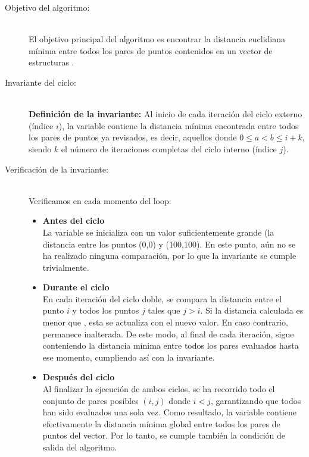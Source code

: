 \documentclass[main.tex]{subfiles}
\begin{document}
\begin{description}
	\item[Objetivo del algoritmo:] ~\\
	      El objetivo principal del algoritmo es encontrar la distancia euclidiana mínima entre todos
	      los pares de puntos contenidos en un vector de estructuras .

	\item[Invariante del ciclo:] ~\\
	      \textbf{Definición de la invariante:} Al inicio de cada iteración del ciclo externo (índice
	      $i$), la variable  contiene la distancia mínima encontrada entre todos los
	      pares de puntos ya revisados, es decir, aquellos donde $0 \leq a < b \leq i + k$, siendo $k$
	      el número de iteraciones completas del ciclo interno (índice $j$).

	\item[Verificación de la invariante:] ~\\
	      Verificamos en cada momento del loop:

	      \begin{itemize}
		      \item \textbf{Antes del ciclo} \\
		            La variable  se inicializa con un valor suficientemente grande (la
		            distancia entre los puntos (0,0) y (100,100). En este punto, aún no se ha realizado
		            ninguna comparación, por lo que la invariante se cumple trivialmente.

		      \item \textbf{Durante el ciclo} \\
		            En cada iteración del ciclo doble, se compara la distancia entre el punto $i$ y
		            todos los puntos $j$ tales que $j > i$. Si la distancia calculada es menor que
		            , esta se actualiza con el nuevo valor. En caso contrario,
		             permanece inalterada. De este modo, al final de cada iteración,
		             sigue conteniendo la distancia mínima entre todos los pares
		            evaluados hasta ese momento, cumpliendo así con la invariante.

		      \item \textbf{Después del ciclo} \\
		            Al finalizar la ejecución de ambos ciclos, se ha recorrido todo el conjunto de pares
		            posibles $(i, j)$ donde $i < j$, garantizando que todos han sido evaluados una sola
		            vez. Como resultado, la variable  contiene efectivamente la
		            distancia mínima global entre todos los pares de puntos del vector. Por lo tanto, se
		            cumple también la condición de salida del algoritmo.
	      \end{itemize}


\end{description}
\end{document}
